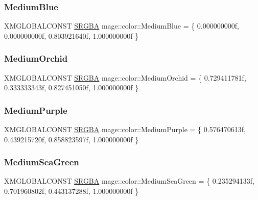 \hypertarget{namespacemage_1_1color_acc9024a2f7200f942578b882300265b0}{}\label{namespacemage_1_1color_acc9024a2f7200f942578b882300265b0} 
\subsubsection{\texorpdfstring{Medium\+Blue}{MediumBlue}}
{\footnotesize\ttfamily X\+M\+G\+L\+O\+B\+A\+L\+C\+O\+N\+ST \hyperlink{structmage_1_1_s_r_g_b_a}{S\+R\+G\+BA} mage\+::color\+::\+Medium\+Blue = \{ 0.\+000000000f, 0.\+000000000f, 0.\+803921640f, 1.\+000000000f \}}

\hypertarget{namespacemage_1_1color_ad03bd3d3bae08d9fba0808ab7acb1faf}{}\label{namespacemage_1_1color_ad03bd3d3bae08d9fba0808ab7acb1faf} 
\subsubsection{\texorpdfstring{Medium\+Orchid}{MediumOrchid}}
{\footnotesize\ttfamily X\+M\+G\+L\+O\+B\+A\+L\+C\+O\+N\+ST \hyperlink{structmage_1_1_s_r_g_b_a}{S\+R\+G\+BA} mage\+::color\+::\+Medium\+Orchid = \{ 0.\+729411781f, 0.\+333333343f, 0.\+827451050f, 1.\+000000000f \}}

\hypertarget{namespacemage_1_1color_a5cd4763988829ae4c93dde2a3f05535b}{}\label{namespacemage_1_1color_a5cd4763988829ae4c93dde2a3f05535b} 
\subsubsection{\texorpdfstring{Medium\+Purple}{MediumPurple}}
{\footnotesize\ttfamily X\+M\+G\+L\+O\+B\+A\+L\+C\+O\+N\+ST \hyperlink{structmage_1_1_s_r_g_b_a}{S\+R\+G\+BA} mage\+::color\+::\+Medium\+Purple = \{ 0.\+576470613f, 0.\+439215720f, 0.\+858823597f, 1.\+000000000f \}}

\hypertarget{namespacemage_1_1color_a015842619a356e8cd61d0feac357c5b8}{}\label{namespacemage_1_1color_a015842619a356e8cd61d0feac357c5b8} 
\subsubsection{\texorpdfstring{Medium\+Sea\+Green}{MediumSeaGreen}}
{\footnotesize\ttfamily X\+M\+G\+L\+O\+B\+A\+L\+C\+O\+N\+ST \hyperlink{structmage_1_1_s_r_g_b_a}{S\+R\+G\+BA} mage\+::color\+::\+Medium\+Sea\+Green = \{ 0.\+235294133f, 0.\+701960802f, 0.\+443137288f, 1.\+000000000f \}}

